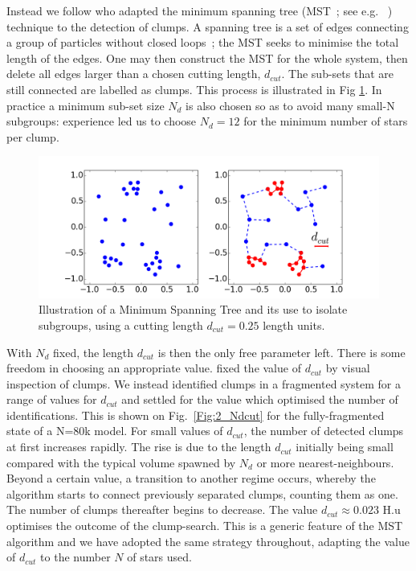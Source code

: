 Instead we follow \cite{Maschberger2010} who adapted the minimum spanning tree (MST~; see e.g. ~\citealt{Allison2009b,Olczak2011}) technique to the detection of clumps. A spanning tree is a set of edges connecting a group of  particles without closed loops~; the MST seeks to minimise the total length of the edges. One may then construct the MST for the whole system, then delete all edges larger than a chosen cutting length, $d_{cut}$. The sub-sets that are still connected  are labelled as clumps. This process is illustrated in Fig \ref{Fig:2_MST}. In practice a minimum sub-set size $N_d$  is also chosen so as to avoid many small-N subgroups: experience led us to choose  $N_d = 12$ for the minimum number of stars per clump. 

\begin{figure}
\begin{center}
\includegraphics[width=0.8\columnwidth]{Figures/2_MST.png}
\end{center}
\caption[Illustration of a Minimum Spanning Tree and its use to isolate subgroups]{Illustration of a Minimum Spanning Tree and its use to isolate subgroups, using a cutting length $d_{cut} = 0.25$ length units.}
\label{Fig:2_MST}
\end{figure}


With $N_d$ fixed, the length $d_{cut}$ is then the only free parameter left. There is some freedom 
in choosing an appropriate value. \cite{Maschberger2010} fixed the value of  $d_{cut}$ by visual inspection of clumps.  We instead  identified  clumps in a fragmented system for a range of values for $d_{cut}$ and settled for the value  which optimised the number of identifications. This is shown on Fig.~\ref{Fig:2_Ndcut} for the fully-fragmented state of a N=80k \HubLem model. For small values of $d_{cut}$, the number of detected clumps at first  increases rapidly. The rise is due  to the length $d_{cut}$ initially being small compared with the typical volume spawned by $N_d$ or more  nearest-neighbours. Beyond a certain value, a transition to another regime occurs, whereby the algorithm starts to connect previously separated clumps, counting them as one. The number of clumps thereafter begins to decrease. The value $d_{cut} \approx 0.023$ H.u optimises the outcome of the clump-search. This is a generic feature of the MST algorithm and we have adopted the same strategy throughout, adapting the value of $d_{cut}$ to the number $N$ of stars used. 






